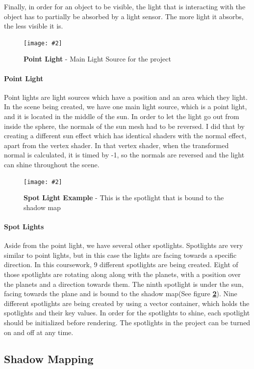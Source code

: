\documentclass[10pt, a4paper]{article}
\newcommand{\figuremacro}[5]{
    \begin{figure}[#1]
        \centering
        \texttt{[image: \#2]}
        \caption[#3]{\textbf{#3}#4}
        \label{fig:#2}
    \end{figure}
}
\begin{document}
	Finally, in order for an object to be visible, the light that is interacting with the object has to partially be absorbed by a light sensor. The more light it absorbs, the less visible it is.
	
	
	\figuremacro{H}{Sun}{Point Light}{ - Main Light Source for the project}{1.0}
	
	\paragraph{Point Light}  Point lights are light sources which have a position and an area which they light. In the scene being created, we have one main light source, which is a point light, and it is located in the middle of the sun. In order to let the light go out from inside the sphere, the normals of the sun mesh had to be reversed. I did that by creating a different sun effect which has identical shaders with the normal effect, apart from the vertex shader. In that vertex shader, when the transformed normal is calculated, it is timed by -1, so the normals are reversed and the light can shine throughout the scene.
	
	\figuremacro{H}{Spotlight_Shadow}{Spot Light Example}{ - This is the spotlight that is bound to the shadow map}{1.0}
	
	\paragraph{Spot Lights} Aside from the point light, we have several other spotlights. Spotlights are very similar to point lights, but in this case the lights are facing towards a specific direction. In this coursework, 9 different spotlights are being created. Eight of those spotlights are rotating along along with the planets, with a position over the planets and a direction towards them. The ninth spotlight is under the sun, facing towards the plane and is bound to the shadow map(See figure \textbf{\ref{fig:Spotlight_Shadow}}). Nine different spotlights are being created by using a vector container, which holds the spotlights and their key values. In order for the spotlights to shine, each spotlight should be initialized before rendering. The spotlights in the project can be turned on and off at any time.
	



\subsection{Shadow Mapping}
\end{document}
